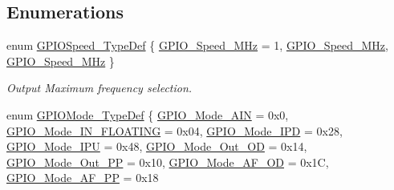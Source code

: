\subsection*{Enumerations}
\begin{DoxyCompactItemize}
\item 
enum \hyperlink{group___g_p_i_o___exported___types_ga062ad92b67b4a1f301c161022cf3ba8e}{G\+P\+I\+O\+Speed\+\_\+\+Type\+Def} \{ \hyperlink{group___g_p_i_o___exported___types_gga062ad92b67b4a1f301c161022cf3ba8ea8c567e4b0186e3708cd7020c13da6439}{G\+P\+I\+O\+\_\+\+Speed\+\_\+M\+Hz} = 1, 
\hyperlink{group___g_p_i_o___exported___types_gga062ad92b67b4a1f301c161022cf3ba8ea9bff9e174639332007c914483361be18}{G\+P\+I\+O\+\_\+\+Speed\+\_\+M\+Hz}, 
\hyperlink{group___g_p_i_o___exported___types_gga062ad92b67b4a1f301c161022cf3ba8ea9c47db10456202ac05134b12738ce581}{G\+P\+I\+O\+\_\+\+Speed\+\_\+M\+Hz}
 \}\begin{DoxyCompactList}\small\item\em Output Maximum frequency selection. \end{DoxyCompactList}
\item 
enum \hyperlink{group___g_p_i_o___exported___types_ga1347339e1c84a196fabbb31205eec5d4}{G\+P\+I\+O\+Mode\+\_\+\+Type\+Def} \{ \newline
\hyperlink{group___g_p_i_o___exported___types_gga1347339e1c84a196fabbb31205eec5d4a3b9a166bf59b96c68c5c0c59811b80fc}{G\+P\+I\+O\+\_\+\+Mode\+\_\+\+A\+IN} = 0x0, 
\hyperlink{group___g_p_i_o___exported___types_gga1347339e1c84a196fabbb31205eec5d4a0e3d2ce89b42f093d327a5e42e4d7cc2}{G\+P\+I\+O\+\_\+\+Mode\+\_\+\+I\+N\+\_\+\+F\+L\+O\+A\+T\+I\+NG} = 0x04, 
\hyperlink{group___g_p_i_o___exported___types_gga1347339e1c84a196fabbb31205eec5d4ad5b7c382c280d0b14786aa7e0af783dc}{G\+P\+I\+O\+\_\+\+Mode\+\_\+\+I\+PD} = 0x28, 
\hyperlink{group___g_p_i_o___exported___types_gga1347339e1c84a196fabbb31205eec5d4adc5187fa416ea708ee4cb445ef2c59e7}{G\+P\+I\+O\+\_\+\+Mode\+\_\+\+I\+PU} = 0x48, 
\newline
\hyperlink{group___g_p_i_o___exported___types_gga1347339e1c84a196fabbb31205eec5d4a629b05b1e9adee098eaf648b044dde0b}{G\+P\+I\+O\+\_\+\+Mode\+\_\+\+Out\+\_\+\+OD} = 0x14, 
\hyperlink{group___g_p_i_o___exported___types_gga1347339e1c84a196fabbb31205eec5d4a0eee8242abb8f2f8a97bbdf0f1dc59b2}{G\+P\+I\+O\+\_\+\+Mode\+\_\+\+Out\+\_\+\+PP} = 0x10, 
\hyperlink{group___g_p_i_o___exported___types_gga1347339e1c84a196fabbb31205eec5d4ac34bf80d30de7b34444c9cbdb20695b5}{G\+P\+I\+O\+\_\+\+Mode\+\_\+\+A\+F\+\_\+\+OD} = 0x1C, 
\hyperlink{group___g_p_i_o___exported___types_gga1347339e1c84a196fabbb31205eec5d4a5c7a69abc1bf31a8d24e896ed94bded9}{G\+P\+I\+O\+\_\+\+Mode\+\_\+\+A\+F\+\_\+\+PP} = 0x18

\end{DoxyCompactItemize}
